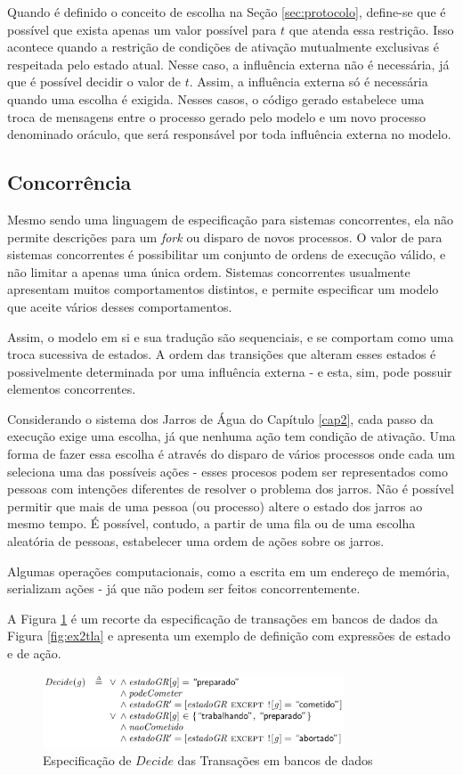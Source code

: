 Quando é definido o conceito de escolha na Seção \ref{sec:protocolo}, define-se que é possível
que exista apenas um valor possível para $t$ que atenda essa restrição. Isso acontece quando a restrição
de condições de ativação mutualmente exclusivas é respeitada pelo estado atual.
Nesse caso, a influência externa não é necessária, já que é possível decidir o
valor de $t$. Assim, a influência externa só é necessária quando uma escolha é
exigida. Nesses casos, o código gerado estabelece uma troca de mensagens entre o
processo gerado pelo modelo e um novo processo denominado oráculo, que será
responsável por toda influência externa no modelo.

\subsection{Concorrência}

Mesmo \TLA sendo uma linguagem de especificação para sistemas concorrentes, ela
não permite descrições para um \textit{fork} ou disparo de novos
processos. O valor de \TLA para sistemas concorrentes é possibilitar um conjunto
de ordens de execução válido, e não limitar a apenas uma única ordem. Sistemas
concorrentes usualmente apresentam muitos comportamentos distintos, e \TLA
permite especificar um modelo que aceite vários desses comportamentos.

Assim, o modelo em si e sua tradução são sequenciais, e se comportam como uma troca
sucessiva de estados. A ordem das transições que alteram esses estados é
possivelmente determinada por uma influência externa - e esta, sim, pode possuir
elementos concorrentes.

Considerando o sistema dos Jarros de Água do Capítulo \ref{cap2}, cada passo da
execução exige uma escolha, já que nenhuma ação tem condição de ativação. Uma
forma de fazer essa escolha é através do disparo de vários processos onde cada
um seleciona uma das possíveis ações - esses procesos podem ser representados
como pessoas com intenções diferentes de resolver o problema dos jarros. Não é
possível permitir que mais de uma pessoa (ou processo) altere o estado dos
jarros ao mesmo tempo. É possível, contudo, a partir de uma fila ou de uma
escolha aleatória de pessoas, estabelecer uma ordem de ações sobre os jarros.

Algumas operações computacionais, como a escrita em um endereço de memória,
serializam ações - já que não podem ser feitos concorrentemente.

A Figura \ref{fig:decide-tla} é um recorte da especificação de transações em
bancos de dados da Figura \ref{fig:ex2tla} e apresenta um exemplo de definição
com expressões de estado e de ação.  


\begin{figure}[h]
  \centering
  \includegraphics[width=0.8\textwidth]{Decide.png}
  \caption{Especificação de $Decide$ das Transações em bancos de dados}
  \label{fig:decide-tla}
\end{figure}